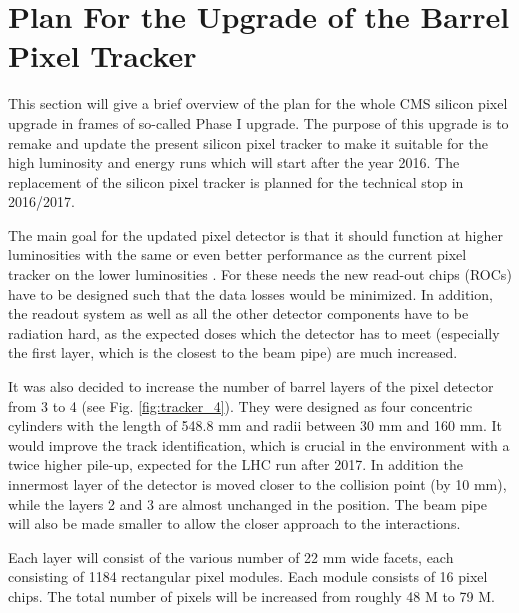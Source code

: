 \section{Plan For the Upgrade of the Barrel Pixel Tracker}

This section will give a brief overview of the plan for the whole CMS silicon pixel upgrade in frames of so-called
Phase I upgrade. The purpose of this upgrade is to remake and update the present silicon pixel tracker to make it 
suitable for the high luminosity and energy runs which will start after the year 2016. The replacement of the silicon
pixel tracker is planned for the technical stop in 2016/2017. 

The main goal for the updated pixel detector is that it should function at higher luminosities with the same or even
better performance as the current pixel tracker on the lower luminosities \cite{CMS:2012sda}. For these needs the new read-out chips
(ROCs) have to be designed such that the data losses would be minimized. In addition, the readout system as well as all
the other detector components have to be radiation hard, as the expected doses which the detector has to meet (especially
the first layer, which is the closest to the beam pipe) are much increased.

It was also decided to increase the number of barrel layers of the pixel detector from 3 to 4 (see Fig. \ref{fig:tracker_4}).
They were designed as four concentric cylinders with the length of 548.8 mm and radii between 30 mm and 160 mm.
It would improve the track identification, which is crucial in the environment with a twice higher pile-up, expected for the 
LHC run after 2017. In addition the innermost layer of the detector is moved closer to the collision point (by 10 mm), while
the layers 2 and 3 are almost unchanged in the position. The beam pipe
will also be made smaller to allow the closer approach to the interactions.

Each layer will consist of the various number of 22 mm wide facets, each consisting of 1184 rectangular pixel modules. Each module
consists of 16 pixel chips. The total number of pixels will be increased from roughly 48 M to 79 M.


